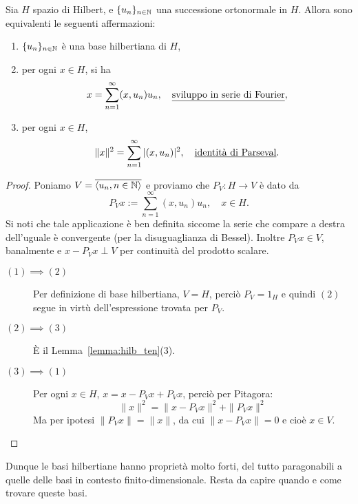 \begin{theorem}[di Fourier]
	Sia $H$ spazio di Hilbert, e $\{u_n\}_{n \in \mathbb{N}}$ una successione ortonormale in $H$.
	Allora sono equivalenti le seguenti affermazioni:
	\begin{enumerate}
		\item $\{u_n\}_{n \in \mathbb{N}}$ è una base hilbertiana di $H$,
		\item per ogni $x \in H$, si ha
		\begin{equation*}
			x= \sum_{n=1}^\infty (x,u_n)u_n, \quad \text{\underline{sviluppo in serie di Fourier}},
		\end{equation*}
		\item per ogni $x \in H$,
		\begin{equation*}
			\|x\|^2 = \sum_{n=1}^\infty |(x,u_n)|^2, \quad \text{\underline{identità di Parseval}}.
		\end{equation*}
	\end{enumerate}
\end{theorem}
\begin{proof}
	Poniamo $V = \overline{\langle u_n, n \in \mathbb{N} \rangle}$ e proviamo che $P_V : H \to V$ è dato da
	\begin{equation*}
		P_V x := \sum_{n=1}^\infty (x,u_n)u_n, \quad x \in H.
	\end{equation*}
	Si noti che tale applicazione è ben definita siccome la serie che compare a destra dell'uguale è convergente (per la disuguaglianza di Bessel). Inoltre $P_V x \in V$, banalmente e $x- P_V x \perp V$ per continuità del prodotto scalare.
	\begin{description}
		\item[$(1) \implies (2)$] Per definizione di base hilbertiana, $V=H$, perciò $P_V = 1_H$ e quindi $(2)$ segue in virtù dell'espressione trovata per $P_V$.
		\item[$(2) \implies (3)$] È il Lemma~\ref{lemma:hilb_ten}(3).
		\item[$(3) \implies (1)$] Per ogni $x \in H$, $x = x-P_V x + P_Vx$, perciò per Pitagora:
		\begin{equation*}
			\|x\|^2 = \|x-P_Vx\|^2 + \|P_Vx\|^2
		\end{equation*}
		Ma per ipotesi $\|P_Vx\|=\|x\|$, da cui $\|x-P_Vx\|=0$ e cioè $x \in V$.
	\end{description}
\end{proof}

Dunque le basi hilbertiane hanno proprietà molto forti, del tutto paragonabili a quelle delle basi in contesto finito-dimensionale. Resta da capire quando e come trovare queste basi.

